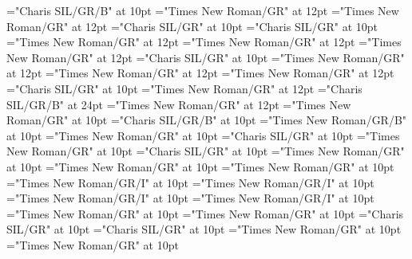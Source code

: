 \documentclass[a4paper]{article}
\begin{document}
\font\xitemxitemLexEntrypublishStemComponentTargetHeadWordRefbefore="Charis SIL/GR/B" at 10pt
\font\xitemxitemLexEntryTypepublishStemComplexFormTypeReverseAbbrPubbefore="Times New Roman/GR" at 12pt
\font\xitemxitemLexEntryTypepublishStemEntryTypeAbbreviationPubbefore="Times New Roman/GR" at 12pt
\font\xitemxitemLexSensepublishStemGlossPubLdbefore="Charis SIL/GR" at 10pt
\font\xitemxitemLexSensepublishStemGlossPubLebefore="Charis SIL/GR" at 10pt
\font\xitemxitempartofspeechbefore="Times New Roman/GR" at 12pt
\font\xitemxitempictureLabelbefore="Times New Roman/GR" at 12pt
\font\xitemxitemprimaryrefsbefore="Times New Roman/GR" at 12pt
\font\xitemxitempronunciationbefore="Charis SIL/GR" at 10pt
\font\xitemxitempronunciationsbefore="Times New Roman/GR" at 12pt
\font\sensesensesensesbefore="Times New Roman/GR" at 12pt
\font\xitemxitemtranslationbefore="Times New Roman/GR" at 12pt
\font\xitemxitemtranslationLdbefore="Charis SIL/GR" at 10pt
\font{}="Times New Roman/GR" at 12pt
\font{}="Charis SIL/GR/B" at 24pt
\font{}="Times New Roman/GR" at 12pt
\font\entryletData="Times New Roman/GR" at 10pt
\font\headwordggoTeluINentryletData="Charis SIL/GR/B" at 10pt
\font\spanenheadwordggoTeluINentryletData="Times New Roman/GR/B" at 10pt
\font\pronunciationsentryletData="Times New Roman/GR" at 10pt
\font\pronunciationggofonipaxemicpronunciationsentryletData="Charis SIL/GR" at 10pt
\font\spanenpronunciationggofonipaxemicpronunciationsentryletData="Times New Roman/GR" at 10pt
\font\spanggofonipaxemicpronunciationggofonipaxemicpronunciationsentryletData="Charis SIL/GR" at 10pt
\font\spanenpronunciationsentryletData="Times New Roman/GR" at 10pt
\font\sensesentryletData="Times New Roman/GR" at 10pt
\font\sensesensesentryletData="Times New Roman/GR" at 10pt
\font\grammaticalinfosensesensesentryletData="Times New Roman/GR/I" at 10pt
\font\partofspeechengrammaticalinfosensesensesentryletData="Times New Roman/GR/I" at 10pt
\font\spanenpartofspeechengrammaticalinfosensesensesentryletData="Times New Roman/GR/I" at 10pt
\font\spanengrammaticalinfosensesensesentryletData="Times New Roman/GR/I" at 10pt
\font{}="Times New Roman/GR" at 10pt
\font\spanendefinitionensensesensesentryletData="Times New Roman/GR" at 10pt
\font\LexSensepublishStemGlossPubLdtesensesensesentryletData="Charis SIL/GR" at 10pt
\font\spanteLexSensepublishStemGlossPubLdtesensesensesentryletData="Charis SIL/GR" at 10pt
\font\spanenLexSensepublishStemGlossPubLdtesensesensesentryletData="Times New Roman/GR" at 10pt
\font\spanensensesentryletData="Times New Roman/GR" at 10pt
\end{document}
